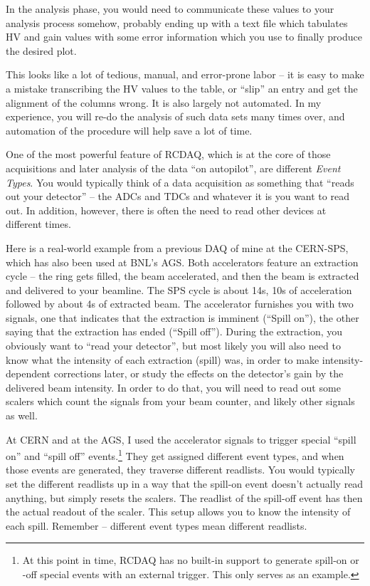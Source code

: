 \documentclass{article}[11pt]
\begin{document}
In the analysis phase, you would need to communicate
these values to your analysis process somehow, probably ending up with
a text file which tabulates HV and gain values with some error
information which you use to finally produce the desired plot.

This looks like a lot of tedious, manual, and error-prone labor -- it
is easy to make a mistake transcribing the HV values to the table, or
``slip'' an entry and get the alignment of the columns wrong. It is
also largely not automated. In my experience, you will re-do the
analysis of such data sets many times over, and automation of the
procedure will help save a lot of time.

One of the most powerful feature of RCDAQ, which is at the core of
those acquisitions and later analysis of the data ``on autopilot'', are
different \emph{Event Types}. You would typically think of a data
acquisition as something that ``reads out your detector'' -- the ADCs
and TDCs and whatever it is you want to read out. In addition,
however, there is often the need to read other devices at different times. 

Here is a real-world example from a previous DAQ of mine at the
CERN-SPS, which has also been used at BNL's AGS. Both accelerators
feature an extraction cycle -- the ring gets filled, the beam
accelerated, and then the beam is extracted and delivered to your
beamline. The SPS cycle is about 14s, 10s of acceleration followed by
about 4s of extracted beam. The accelerator furnishes you with two
signals, one that indicates that the extraction is imminent (``Spill
on''), the other saying that the extraction has ended (``Spill
off''). During the extraction, you obviously want to ``read your
detector'', but most likely you will also need to know what the
intensity of each extraction (spill) was, in order to make
intensity-dependent corrections later, or study the effects on the
detector's gain by the delivered beam intensity. In order to do that,
you will need to read out some scalers which count the signals from
your beam counter, and likely other signals as well.

At CERN and at the AGS, I used the accelerator signals to trigger special
``spill on'' and ``spill off'' events.\footnote{At this point in time,
  RCDAQ has no built-in support to generate spill-on or -off special
  events with an external trigger. This only serves as an example.}
They get assigned different event types, and when those events are
generated, they traverse different readlists. You would typically set
the different readlists up in a way that the spill-on event doesn't
actually read anything, but simply resets the scalers. The readlist of
the spill-off event has then the actual readout of the scaler.  This
setup allows you to know the intensity of each spill. Remember --
different event types mean different readlists.
\end{document}
